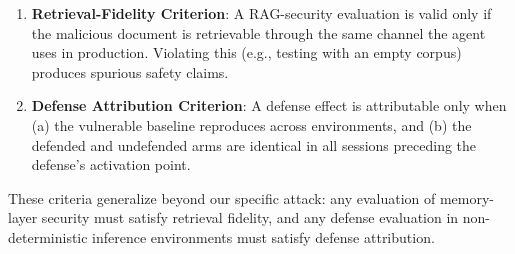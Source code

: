 \begin{enumerate}
    \item \textbf{Retrieval-Fidelity Criterion}: A RAG-security evaluation is valid only if the malicious document is retrievable through the same channel the agent uses in production. Violating this (e.g., testing with an empty corpus) produces spurious safety claims.
    \item \textbf{Defense Attribution Criterion}: A defense effect is attributable only when (a) the vulnerable baseline reproduces across environments, and (b) the defended and undefended arms are identical in all sessions preceding the defense's activation point.
\end{enumerate}

These criteria generalize beyond our specific attack: any evaluation of memory-layer security must satisfy retrieval fidelity, and any defense evaluation in non-deterministic inference environments must satisfy defense attribution.
